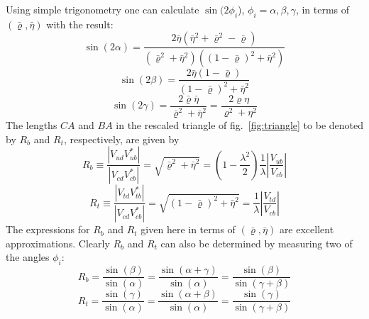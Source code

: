 Using simple trigonometry one can calculate $\sin(2\phi_i$), $\phi_i=
\alpha, \beta, \gamma$, in terms of $(\bar\varrho,\bar\eta)$ with the result:
\begin{equation}\label{2.89}
\sin(2\alpha)=\frac{2\bar\eta(\bar\eta^2+\bar\varrho^2-\bar\varrho)}
  {(\bar\varrho^2+\bar\eta^2)((1-\bar\varrho)^2
  +\bar\eta^2)}  
\end{equation}
\begin{equation}\label{2.90}
\sin(2\beta)=\frac{2\bar\eta(1-\bar\varrho)}{(1-\bar\varrho)^2 + \bar\eta^2}
\end{equation}
 \begin{equation}\label{2.91}
\sin(2\gamma)=\frac{2\bar\varrho\bar\eta}{\bar\varrho^2+\bar\eta^2}=
\frac{2\varrho\eta}{\varrho^2+\eta^2}
\end{equation}
%
The lengths $CA$ and $BA$ in the
rescaled triangle of fig.~\ref{fig:triangle} to be denoted by $R_b$ and $R_t$,
respectively, are given by
%
\begin{equation}\label{2.94}
R_b \equiv \frac{| V_{ud}^{}V^*_{ub}|}{| V_{cd}^{}V^*_{cb}|}
= \sqrt{\bar\varrho^2 +\bar\eta^2}
= (1-\frac{\lambda^2}{2})\frac{1}{\lambda}
\left| \frac{V_{ub}}{V_{cb}} \right|
\end{equation}
\begin{equation}\label{2.95}
R_t \equiv \frac{| V_{td}^{}V^*_{tb}|}{| V_{cd}^{}V^*_{cb}|} =
 \sqrt{(1-\bar\varrho)^2 +\bar\eta^2}
=\frac{1}{\lambda} \left| \frac{V_{td}}{V_{cb}} \right|
\end{equation}
The expressions for $R_b$ and $R_t$ given here in terms of
$(\bar\varrho, \bar\eta)$ 
are excellent approximations. Clearly $R_b$ and $R_t$
can also be determined by measuring two of the angles $\phi_i$:
\begin{equation}\label{2.96}
R_b=\frac{\sin(\beta)}{\sin(\alpha)}=
\frac{\sin(\alpha+\gamma)}{\sin(\alpha)}=
\frac{\sin(\beta)}{\sin(\gamma+\beta)}
\end{equation}
\begin{equation}\label{2.97}
R_t=\frac{\sin(\gamma)}{\sin(\alpha)}=
\frac{\sin(\alpha+\beta)}{\sin(\alpha)}=
\frac{\sin(\gamma)}{\sin(\gamma+\beta)}
\end{equation}

